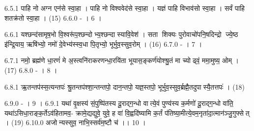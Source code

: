 6.5.1
पाहि नो अग्न एन॑से स्वा॒हा । पाहि नो विश्ववेद॑से स्वा॒हा । यज्ञं पाहि विभाव॑सो स्वा॒हा । सर्वं पाहि शतक्र॑तो स्वा॒हा । (15)
6.6.0
- । 6 ।
\anuvakamend

6.6.1
यश्छन्द॑सामृष॒भो वि॒श्वरू॑प॒श्छन्दोभ्य॒श्छन्दास्यावि॒वेश॑ । सता शिक्यः पुरोवाचो॑पनि॒षदिन्द्रो ज्ये॒ष्ठ इ॑न्द्रि॒याय॒ ऋषि॑भ्यो॒ नमो॑ दे॒वेभ्य॑स्स्व॒धा पि॒तृभ्यो॒ भूर्भुव॒स्सुव॒रोम् । (16)
6.7.0
- । 7 ।
\anuvakamend

6.7.1
नमो॒ ब्रह्म॑णे धा॒रणं॑ मे अ॒स्त्वनि॑राकरणन्धा॒रयि॑ता भूयास॒ङ्कर्ण॑योश्श्रु॒तं मा च्योढ्वं॒ ममा॒मुष्य॒ ओम् । (17)
6.8.0
- । 8 ।
\anuvakamend

6.8.1
ऋ॒तन्तप॑स्स॒त्यन्तपः॑ श्रु॒तन्तप॑श्शा॒न्तन्तपो॒ दान॒न्तपो॒ यज्ञ॒स्तपो॒ भूर्भुव॒स्सुव॒र्ब्रह्मै॒तदुपास्यै॒तत्तपः॑ । (18)
\anuvakamend

6.9.0
- । 9 ।
6.9.1
यथा॑ वृ॒क्षस्य॑ सं॒पुष्पि॑तस्य दू॒राद्ग॒न्धो वात्ये॒वं पुण्य॑स्य क॒र्मणो॑ दू॒राद्ग॒न्धो वा॑ति॒ यथा॑ऽसिधा॒राङ्क॒र्तेऽव॑हितामव॒- क्रामे॒द्यद्युवे॒ युवे॒ ह वा॑ वि॒ह्वदि॑ष्यामि क॒र्तं प॑तिष्या॒मीत्ये॒वम॒नृता॑दा॒त्मान॑ञ्जु॒गुफ्सेत् । (19)
6.10.0
अजोन्यस्सुव॒ नाभि॒स्सर्व॑म॒ष्टौ च॑ ।। 10 ।
\anuvakamend

